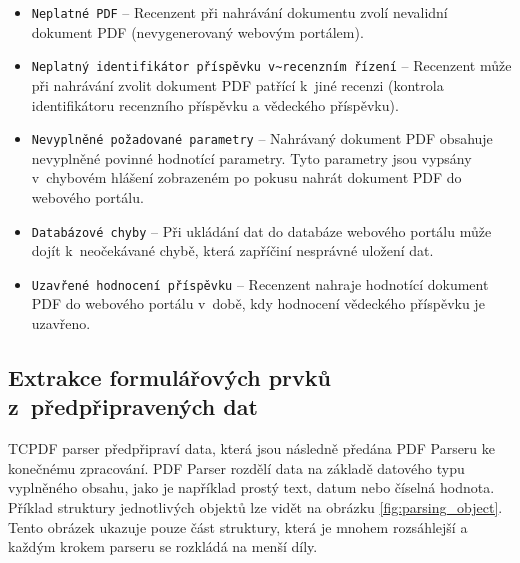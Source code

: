 \begin{itemize}
	\item \verb|Neplatné PDF| -- Recenzent při nahrávání dokumentu zvolí nevalidní dokument PDF (nevygenerovaný webovým portálem).
	\item \verb|Neplatný identifikátor příspěvku v~recenzním řízení| -- Recenzent může při nahrávání zvolit dokument PDF patřící k~jiné recenzi (kontrola identifikátoru recenzního příspěvku a vědeckého příspěvku).
	\item \verb|Nevyplněné požadované parametry| -- Nahrávaný dokument PDF obsahuje nevyplněné povinné hodnotící parametry. Tyto parametry jsou vypsány v~chybovém hlášení zobrazeném po pokusu nahrát dokument PDF do webového portálu.
	\item \verb|Databázové chyby| -- Při ukládání dat do databáze webového portálu může dojít k~neočekávané chybě, která zapříčiní nesprávné uložení dat. 
	\item \verb|Uzavřené hodnocení příspěvku| -- Recenzent nahraje hodnotící dokument PDF do webového portálu v~době, kdy hodnocení vědeckého příspěvku je uzavřeno.
\end{itemize}

\subsection{Extrakce formulářových prvků z~předpřipravených dat}
TCPDF parser předpřipraví data, která jsou následně předána PDF Parseru ke konečnému zpracování. PDF Parser rozdělí data na základě datového typu vyplněného obsahu, jako je například prostý text, datum nebo číselná hodnota. Příklad struktury jednotlivých objektů lze vidět na obrázku \ref{fig:parsing_object}. Tento obrázek ukazuje pouze část struktury, která je mnohem rozsáhlejší a každým krokem parseru se rozkládá na menší díly.

